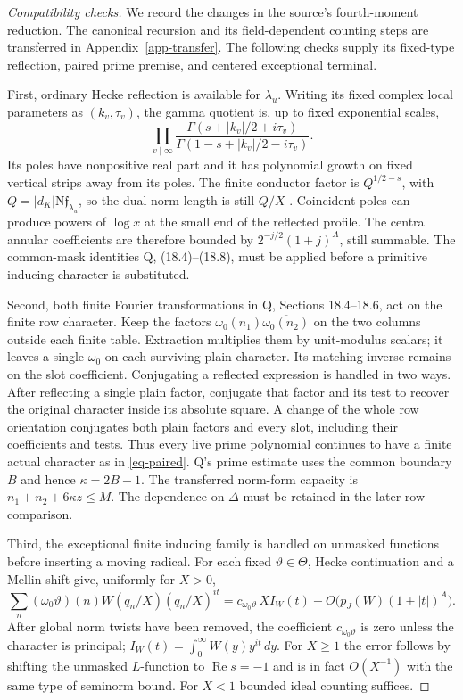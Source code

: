 \documentclass[11pt,a4paper]{article}
\theoremstyle{remark}\newtheorem{remark}[theorem]{Remark}
\newcommand{\N}{\mathrm N}
\newcommand{\Rea}{\operatorname{Re}}
\numberwithin{equation}{section}
\begin{document}
\begin{proof}[Compatibility checks]
We record the changes in the source's fourth-moment reduction.
The canonical recursion and its field-dependent counting steps
are transferred in Appendix~\ref{app-transfer}. The following
checks supply its fixed-type reflection, paired prime premise,
and centered exceptional terminal.

First, ordinary Hecke reflection is available for $\lambda_u$.
Writing its fixed complex local parameters as $(k_v,\tau_v)$,
the gamma quotient is, up to fixed exponential scales,
\[
 \prod_{v\mid\infty}
 \frac{\Gamma(s+|k_v|/2+i\tau_v)}
      {\Gamma(1-s+|k_v|/2-i\tau_v)}.
\]
Its poles have nonpositive real part and it has polynomial growth
on fixed vertical strips away from its poles. The finite conductor
factor is $Q^{1/2-s}$, with $Q=|d_K|\N\mathfrak f_{\lambda_u}$,
so the dual norm length is still $Q/X$ \cite{Tate}.
Coincident poles can produce powers of $\log x$ at the small end
of the reflected profile. The central annular coefficients are
therefore bounded by $2^{-j/2}(1+j)^A$, still summable.
The common-mask identities Q, (18.4)--(18.8), must be applied
before a primitive inducing character is substituted.

Second, both finite Fourier transformations in Q,
Sections 18.4--18.6, act on the finite row character. Keep the
factors $\omega_0(n_1)\overline{\omega_0(n_2)}$ on the two
columns outside each finite table. Extraction multiplies them
by unit-modulus scalars; it leaves a single $\omega_0$ on
each surviving plain character. Its matching inverse remains
on the slot coefficient. Conjugating a reflected expression
is handled in two ways. After reflecting a single plain factor,
conjugate that factor and its test to recover the original
character inside its absolute square. A change of the whole
row orientation conjugates both plain factors and every slot,
including their coefficients and tests. Thus every live prime
polynomial continues to have a finite actual character as in
\eqref{eq-paired}. Q's prime estimate uses the common boundary $B$ and hence
$\kappa=2B-1$. The transferred norm-form capacity is
$n_1+n_2+6\kappa z\le M$. The dependence on $\Delta$ must
be retained in the later row comparison.

Third, the exceptional finite inducing family is handled on
unmasked functions before inserting a moving radical.
For each fixed $\vartheta\in\Theta$, Hecke continuation and a
Mellin shift give, uniformly for $X>0$,
\[
 \sum_n(\omega_0\vartheta)(n)W(q_n/X)(q_n/X)^{it}
 =c_{\omega_0\vartheta}\,X I_W(t)
       +O\bigl(p_J(W)(1+|t|)^A\bigr).
\]
After global norm twists have been removed, the coefficient
$c_{\omega_0\vartheta}$ is zero unless the character is principal;
$I_W(t)=\int_0^\infty W(y)y^{it}\,dy$.
For $X\ge1$ the error follows by shifting the unmasked $L$-function
to $\Rea s=-1$ and is in fact $O(X^{-1})$ with the same type
of seminorm bound. For $X<1$ bounded ideal counting suffices.


\end{proof}
\end{document}
